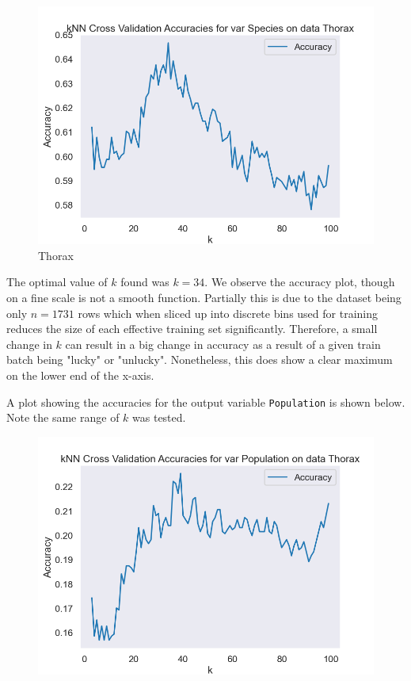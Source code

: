 \documentclass{article}
\begin{document}
\begin{figure}
    \centering
    \includegraphics{plots/Thorax_knn_accuracies_Species.png}
    \caption{Thorax}
    \label{fig:}
\end{figure}

The optimal value of $k$ found was $k = 34$. We observe the accuracy plot, though on a fine scale is not a smooth function. Partially this is due to the dataset being only $n = 1731$ rows which when sliced up into discrete bins used for training reduces the size of each effective training set significantly. Therefore, a small change in $k$ can result in a big change in accuracy as a result of a given train batch being "lucky" or "unlucky". Nonetheless, this does show a clear maximum on the lower end of the x-axis.

A plot showing the accuracies for the output variable \texttt{Population} is shown below. Note the same range of $k$ was tested.

\begin{figure}
    \centering
    \includegraphics{plots/Thorax_knn_accuracies_Population.png}
    \caption{}
    \label{fig:}
\end{figure}
\end{document}
